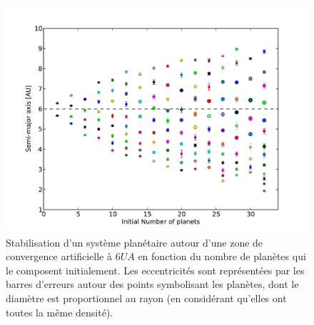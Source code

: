 \begin{figure}[htb]
\centering
\includegraphics[width=0.75\linewidth]{figure/MMR_number.pdf}
\caption{Stabilisation d'un système planétaire autour d'une zone de convergence artificielle à $6\unit{UA}$ en fonction du nombre de planètes qui le composent initialement. Les eccentricités sont représentées par les barres d'erreurs autour des points symbolisant les planètes, dont le diamètre est proportionnel au rayon (en considérant qu'elles ont toutes la même densité).}\label{fig:MMR_number}
\end{figure}

